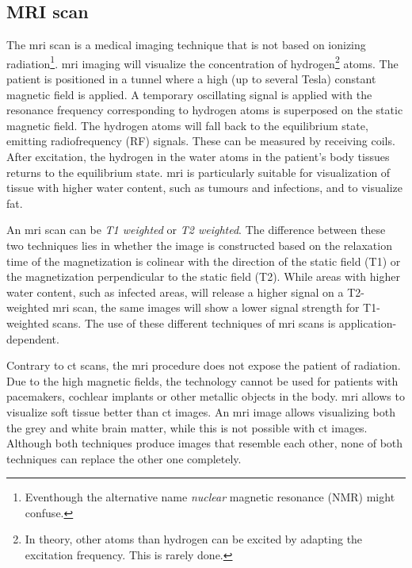 \subsection{MRI scan}
\par{
    The \acrfull{mri} scan is a medical imaging technique that is not based on ionizing radiation\footnote{Eventhough the alternative name \textit{nuclear} magnetic resonance (NMR) might confuse.}.
    \acrshort{mri} imaging will visualize the concentration of hydrogen\footnote{In theory, other atoms than hydrogen can be excited by adapting the excitation frequency. This is rarely done.} atoms.
    The patient is positioned in a tunnel where a high (up to several Tesla) constant magnetic field is applied. A temporary oscillating signal is applied with the resonance frequency corresponding to hydrogen atoms is superposed on the static magnetic field.
    The hydrogen atoms will fall back to the equilibrium state, emitting radiofrequency (RF) signals. These can be measured by receiving coils.
    After excitation, the hydrogen in the water atoms in the patient's body tissues returns to the equilibrium state. \acrlong{mri} is particularly suitable for visualization of tissue with higher water content, such as tumours and infections, and to visualize fat.
}
\par{
    An \acrshort{mri} scan can be \textit{T1 weighted} or \textit{T2 weighted}. 
    The difference between these two techniques lies in whether the image is constructed based on the relaxation time of the magnetization is colinear with the direction of the static field (T1) or the magnetization perpendicular to the static field (T2).
    While areas with higher water content, such as infected areas, will release a higher signal on a T2-weighted \acrshort{mri} scan, the same images will show a lower signal strength for T1-weighted scans.
    The use of these different techniques of \acrshort{mri} scans is application-dependent.  
}
\par{
    Contrary to \acrfull{ct} scans, the \acrlong{mri} procedure does not expose the patient of radiation. Due to the high magnetic fields, the technology cannot be used for patients with pacemakers, cochlear implants or other metallic objects in the body.
    \acrshort{mri} allows to visualize soft tissue better than \acrshort{ct} images. An \acrshort{mri} image allows visualizing both the grey and white brain matter, while this is not possible with \acrshort{ct} images.
    Although both techniques produce images that resemble each other, none of both techniques can replace the other one completely.
}

